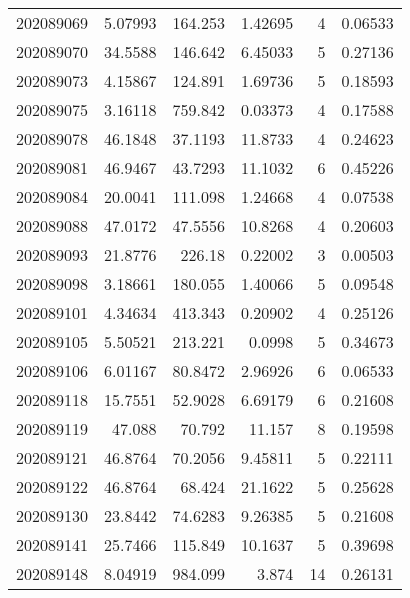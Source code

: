 \begin{tabular}{rrrrrr}
 202089069 &          5.07993 &      164.253  &            1.42695 &           4 & 0.06533 \\
 202089070 &         34.5588  &      146.642  &            6.45033 &           5 & 0.27136 \\
 202089073 &          4.15867 &      124.891  &            1.69736 &           5 & 0.18593 \\
 202089075 &          3.16118 &      759.842  &            0.03373 &           4 & 0.17588 \\
 202089078 &         46.1848  &       37.1193 &           11.8733  &           4 & 0.24623 \\
 202089081 &         46.9467  &       43.7293 &           11.1032  &           6 & 0.45226 \\
 202089084 &         20.0041  &      111.098  &            1.24668 &           4 & 0.07538 \\
 202089088 &         47.0172  &       47.5556 &           10.8268  &           4 & 0.20603 \\
 202089093 &         21.8776  &      226.18   &            0.22002 &           3 & 0.00503 \\
 202089098 &          3.18661 &      180.055  &            1.40066 &           5 & 0.09548 \\
 202089101 &          4.34634 &      413.343  &            0.20902 &           4 & 0.25126 \\
 202089105 &          5.50521 &      213.221  &            0.0998  &           5 & 0.34673 \\
 202089106 &          6.01167 &       80.8472 &            2.96926 &           6 & 0.06533 \\
 202089118 &         15.7551  &       52.9028 &            6.69179 &           6 & 0.21608 \\
 202089119 &         47.088   &       70.792  &           11.157   &           8 & 0.19598 \\
 202089121 &         46.8764  &       70.2056 &            9.45811 &           5 & 0.22111 \\
 202089122 &         46.8764  &       68.424  &           21.1622  &           5 & 0.25628 \\
 202089130 &         23.8442  &       74.6283 &            9.26385 &           5 & 0.21608 \\
 202089141 &         25.7466  &      115.849  &           10.1637  &           5 & 0.39698 \\
 202089148 &          8.04919 &      984.099  &            3.874   &          14 & 0.26131 \\

\end{tabular}
